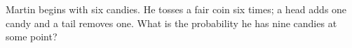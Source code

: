 Martin begins with six candies. He tosses a fair coin six times; a head adds one candy and a tail removes one. What is the probability he has nine candies at some point?
